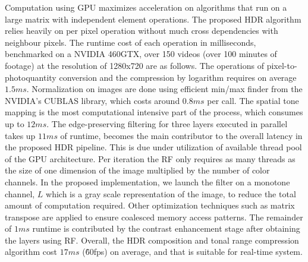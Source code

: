 Computation using GPU maximizes acceleration on algorithms that run on a large matrix with 
independent element operations. The proposed HDR algorithm relies heavily on per pixel operation 
without much cross dependencies with neighbour pixels. The runtime cost of each operation in 
milliseconds, benchmarked on a NVIDIA 460GTX, over 150 videos (over 100 minutes of footage) at 
the resolution of 1280x720 are as follows. The operations of pixel-to-photoquantity conversion and 
the compression by logarithm requires on average $1.5ms$. Normalization on images are done using 
efficient min/max finder from the NVIDIA's CUBLAS library, which costs around $0.8ms$ per call. The 
spatial tone mapping is the most computational intensive part of the process, which consumes up to $12ms$. 
The edge-preserving filtering for three layers executed in parallel takes up $11ms$ of runtime, 
becomes the main contributor to the overall latency in the proposed HDR pipeline. This is due under 
utilization of available thread pool of the GPU architecture.  Per iteration the RF only requires as many 
threads as the size of one dimension of the image multiplied by the number of color channels. In the 
proposed implementation, we launch the filter on a monotone channel, $L$ which is a gray scale 
representation of the image, to reduce the total amount of computation required. Other optimization 
techniques such as matrix transpose are applied to ensure coalesced memory access patterns. The 
remainder of $1ms$ runtime is contributed by the contrast enhancement stage after obtaining the 
layers using RF. Overall, the HDR composition and tonal range compression algorithm cost $17ms$ 
(\~60fps) on average, and that is suitable for real-time system. 


